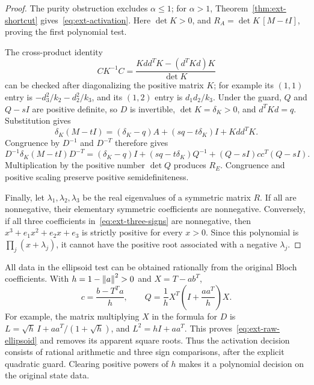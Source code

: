 \begin{proof}
The purity obstruction excludes $\alpha\le1$; for $\alpha>1$,
Theorem~\ref{thm:ext-shortcut} gives~\eqref{eq:ext-activation}.
Here $\det K>0$, and
$R_A=\det K\,[M-tI]$, proving the first polynomial test.

The cross-product identity
\begin{equation}
 CK^{-1}C
 =\frac{Kdd^TK-(d^TKd)K}{\det K}
 \label{eq:ext-cross-inverse}
\end{equation}
can be checked after diagonalizing the positive matrix $K$; for example
its $(1,1)$ entry is $-d_3^2/k_2-d_2^2/k_3$, and its
$(1,2)$ entry is $d_1d_2/k_3$.
Under the guard, $Q$ and $Q-sI$ are positive definite, so $D$ is
invertible, $\det K=\delta_K>0$, and $d^TKd=q$. Substitution gives
\[
 \delta_K(M-tI)
 =(\delta_K-q)A+(s q-t\delta_K)I+Kdd^TK.
 \]
Congruence by $D^{-1}$ and $D^{-T}$ therefore gives
\begin{equation}
 D^{-1}\delta_K(M-tI)D^{-T}
 =(\delta_K-q)I+(s q-t\delta_K)Q^{-1}
   +(Q-sI)cc^T(Q-sI).
 \label{eq:ext-ellipsoid-congruence}
\end{equation}
Multiplication by the positive number $\det Q$ produces $R_E$.
Congruence and positive scaling preserve positive semidefiniteness.

Finally, let $\lambda_1,\lambda_2,\lambda_3$ be the real eigenvalues
of a symmetric matrix $R$. If all are nonnegative, their elementary
symmetric coefficients are nonnegative. Conversely, if all three
coefficients in~\eqref{eq:ext-three-signs} are nonnegative, then
$x^3+e_1x^2+e_2x+e_3$ is strictly positive for every $x>0$.
Since this polynomial is $\prod_j(x+\lambda_j)$, it cannot have
the positive root associated with a negative $\lambda_j$.
\end{proof}

All data in the ellipsoid test can be obtained rationally from the
original Bloch coefficients. With $h=1-\left\lVert a\right\rVert^2>0$ and $X=T-ab^T$,
\begin{equation}
 c=\frac{b-T^Ta}{h},\qquad
 Q=\frac1h X^T\left(I+\frac{aa^T}{h}\right)X.
 \label{eq:ext-raw-ellipsoid}
\end{equation}
For example, the matrix multiplying $X$ in the formula for $D$ is
$L=\sqrt h\,I+aa^T/(1+\sqrt h)$, and $L^2=hI+aa^T$.
This proves~\eqref{eq:ext-raw-ellipsoid} and removes its apparent
square roots. Thus the activation decision consists of rational
arithmetic and three sign comparisons, after the explicit quadratic
guard. Clearing positive powers of $h$ makes it a polynomial
decision on the original state data.

